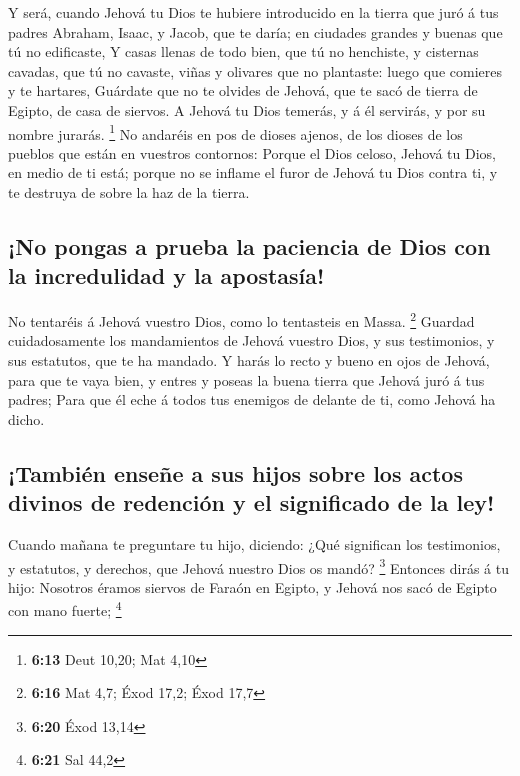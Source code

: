  Y será, cuando Jehová tu Dios te hubiere introducido en la
tierra que juró á tus padres Abraham, Isaac, y Jacob, que te daría; en
ciudades grandes y buenas que tú no edificaste,  Y casas
llenas de todo bien, que tú no henchiste, y cisternas cavadas, que tú no
cavaste, viñas y olivares que no plantaste: luego que comieres y te
hartares,  Guárdate que no te olvides de Jehová, que te
sacó de tierra de Egipto, de casa de siervos.  A Jehová tu
Dios temerás, y á él servirás, y por su nombre jurarás. \footnote{\textbf{6:13}
  Deut 10,20; Mat 4,10}  No andaréis en pos de dioses
ajenos, de los dioses de los pueblos que están en vuestros contornos:
 Porque el Dios celoso, Jehová tu Dios, en medio de ti
está; porque no se inflame el furor de Jehová tu Dios contra ti, y te
destruya de sobre la haz de la tierra.

\hypertarget{no-pongas-a-prueba-la-paciencia-de-dios-con-la-incredulidad-y-la-apostasuxeda}{%
\subsection{¡No pongas a prueba la paciencia de Dios con la incredulidad
y la
apostasía!}\label{no-pongas-a-prueba-la-paciencia-de-dios-con-la-incredulidad-y-la-apostasuxeda}}

 No tentaréis á Jehová vuestro Dios, como lo tentasteis en
Massa. \footnote{\textbf{6:16} Mat 4,7; Éxod 17,2; Éxod 17,7}
 Guardad cuidadosamente los mandamientos de Jehová vuestro
Dios, y sus testimonios, y sus estatutos, que te ha mandado.
 Y harás lo recto y bueno en ojos de Jehová, para que te
vaya bien, y entres y poseas la buena tierra que Jehová juró á tus
padres;  Para que él eche á todos tus enemigos de delante
de ti, como Jehová ha dicho.

\hypertarget{tambiuxe9n-enseuxf1e-a-sus-hijos-sobre-los-actos-divinos-de-redenciuxf3n-y-el-significado-de-la-ley}{%
\subsection{¡También enseñe a sus hijos sobre los actos divinos de
redención y el significado de la
ley!}\label{tambiuxe9n-enseuxf1e-a-sus-hijos-sobre-los-actos-divinos-de-redenciuxf3n-y-el-significado-de-la-ley}}

 Cuando mañana te preguntare tu hijo, diciendo: ¿Qué
significan los testimonios, y estatutos, y derechos, que Jehová nuestro
Dios os mandó? \footnote{\textbf{6:20} Éxod 13,14} 
Entonces dirás á tu hijo: Nosotros éramos siervos de Faraón en Egipto, y
Jehová nos sacó de Egipto con mano fuerte; \footnote{\textbf{6:21} Sal
  44,2}

